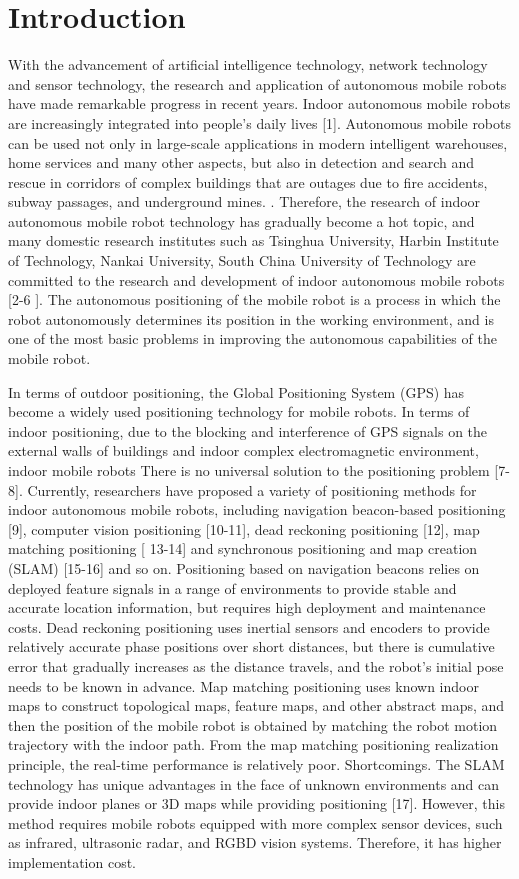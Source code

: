 \documentclass{llncs}
\begin{document}
\section{Introduction}
%
With the advancement of artificial intelligence technology, network technology and sensor technology, the research and application of autonomous mobile robots have made remarkable progress in recent years. Indoor autonomous mobile robots are increasingly integrated into people's daily lives [1]. Autonomous mobile robots can be used not only in large-scale applications in modern intelligent warehouses, home services and many other aspects, but also in detection and search and rescue in corridors of complex buildings that are outages due to fire accidents, subway passages, and underground mines. . Therefore, the research of indoor autonomous mobile robot technology has gradually become a hot topic, and many domestic research institutes such as Tsinghua University, Harbin Institute of Technology, Nankai University, South China University of Technology are committed to the research and development of indoor autonomous mobile robots [2-6 ]. The autonomous positioning of the mobile robot is a process in which the robot autonomously determines its position in the working environment, and is one of the most basic problems in improving the autonomous capabilities of the mobile robot.

In terms of outdoor positioning, the Global Positioning System (GPS) has become a widely used positioning technology for mobile robots. In terms of indoor positioning, due to the blocking and interference of GPS signals on the external walls of buildings and indoor complex electromagnetic environment, indoor mobile robots There is no universal solution to the positioning problem [7-8]. Currently, researchers have proposed a variety of positioning methods for indoor autonomous mobile robots, including navigation beacon-based positioning [9], computer vision positioning [10-11], dead reckoning positioning [12], map matching positioning [ 13-14] and synchronous positioning and map creation (SLAM) [15-16] and so on. Positioning based on navigation beacons relies on deployed feature signals in a range of environments to provide stable and accurate location information, but requires high deployment and maintenance costs. Dead reckoning positioning uses inertial sensors and encoders to provide relatively accurate phase positions over short distances, but there is cumulative error that gradually increases as the distance travels, and the robot's initial pose needs to be known in advance. Map matching positioning uses known indoor maps to construct topological maps, feature maps, and other abstract maps, and then the position of the mobile robot is obtained by matching the robot motion trajectory with the indoor path. From the map matching positioning realization principle, the real-time performance is relatively poor. Shortcomings. The SLAM technology has unique advantages in the face of unknown environments and can provide indoor planes or 3D maps while providing positioning [17]. However, this method requires mobile robots equipped with more complex sensor devices, such as infrared, ultrasonic radar, and RGBD vision systems. Therefore, it has higher implementation cost.
\end{document}
